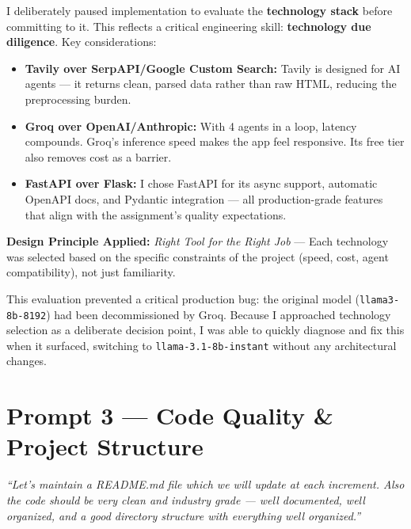 \documentclass[12pt, a4paper]{article}
\begin{document}
\begin{reasonbox}
I deliberately paused implementation to evaluate the \textbf{technology stack} before committing to it. This reflects a critical engineering skill: \textbf{technology due diligence}. Key considerations:

\begin{itemize}[leftmargin=1.5em]
    \item \textbf{Tavily over SerpAPI/Google Custom Search:} Tavily is designed for AI agents — it returns clean, parsed data rather than raw HTML, reducing the preprocessing burden.
    \item \textbf{Groq over OpenAI/Anthropic:} With 4 agents in a loop, latency compounds. Groq's inference speed makes the app feel responsive. Its free tier also removes cost as a barrier.
    \item \textbf{FastAPI over Flask:} I chose FastAPI for its async support, automatic OpenAPI docs, and Pydantic integration — all production-grade features that align with the assignment's quality expectations.
\end{itemize}

\textbf{Design Principle Applied:} \textit{Right Tool for the Right Job} — Each technology was selected based on the specific constraints of the project (speed, cost, agent compatibility), not just familiarity.
\end{reasonbox}

\begin{impactbox}
This evaluation prevented a critical production bug: the original model (\texttt{llama3-8b-8192}) had been decommissioned by Groq. Because I approached technology selection as a deliberate decision point, I was able to quickly diagnose and fix this when it surfaced, switching to \texttt{llama-3.1-8b-instant} without any architectural changes.
\end{impactbox}

\section{Prompt 3 — Code Quality \& Project Structure}

\begin{promptbox}
\textit{``Let's maintain a README.md file which we will update at each increment. Also the code should be very clean and industry grade — well documented, well organized, and a good directory structure with everything well organized.''}
\end{promptbox}
\end{document}
